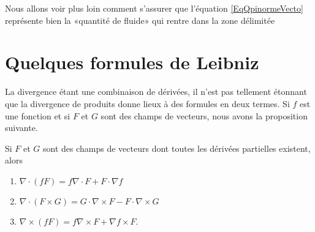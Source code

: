 \begin{remark}
	Nous allons voir plus loin comment s'assurer que l'équation \eqref{EqQpinormeVecto} représente bien la «quantité de fluide» qui rentre dans la zone délimitée
\end{remark}

\section{Quelques formules de Leibniz}

La divergence étant une combinaison de dérivées, il n'est pas tellement étonnant que la divergence de produits donne lieux à des formules en deux termes. Si \( f\) est une fonction et si \( F\) et \( G\) sont des champs de vecteurs, nous avons la proposition suivante.

\begin{proposition}     \label{PROPooDMWEooNaJBCM}
	Si \( F\) et \( G\) sont des champs de vecteurs dont toutes les dérivées partielles existent, alors
	\begin{enumerate}
		\item
		      \( \nabla\cdot(fF)=f\nabla\cdot F+F\cdot\nabla f\)
		\item
		      \( \nabla\cdot(F\times G)=G\cdot\nabla\times F-F\cdot\nabla\times G\)
		\item       \label{ITEMooFDJIooKTnvKj}
		      \( \nabla\times(fF)=f\nabla\times F+\nabla f\times F\).
	\end{enumerate}
\end{proposition}
